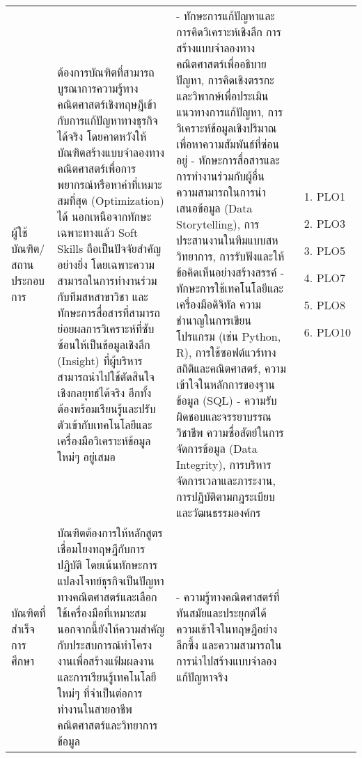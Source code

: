 \begin{longtable}{| >{\raggedright}p{} | >{\raggedright}p{} | >{\raggedright}p{} | >{\centering\arraybackslash}p{} |}
    
    \multicolumn{4}{|l|}{\textbf{ผู้มีส่วนได้ส่วนเสียภายนอก (External Stakeholders)}} \\
    \hline
    ผู้ใช้บัณฑิต/สถานประกอบการ & 
ต้องการบัณฑิตที่สามารถ\newline บูรณาการความรู้ทางคณิตศาสตร์เชิงทฤษฎีเข้ากับการแก้ปัญหาทางธุรกิจได้จริง โดยคาดหวังให้บัณฑิตสร้างแบบจำลองทางคณิตศาสตร์เพื่อการพยากรณ์หรือหาค่าที่เหมาะสมที่สุด (Optimization) ได้ นอกเหนือจากทักษะเฉพาะทางแล้ว Soft Skills ถือเป็นปัจจัยสำคัญอย่างยิ่ง โดยเฉพาะความสามารถในการทำงานร่วมกับทีมสหสาขาวิชา และทักษะการสื่อสารที่สามารถย่อยผลการวิเคราะห์ที่ซับซ้อนให้เป็นข้อมูลเชิงลึก (Insight) ที่ผู้บริหารสามารถนำไปใช้ตัดสินใจเชิงกลยุทธ์ได้จริง อีกทั้งต้องพร้อมเรียนรู้และปรับตัวเข้ากับเทคโนโลยีและเครื่องมือวิเคราะห์ข้อมูลใหม่ๆ อยู่เสมอ &
- ทักษะการแก้ปัญหาและการคิดวิเคราะห์เชิงลึก การสร้างแบบจำลองทางคณิตศาสตร์เพื่ออธิบายปัญหา, การคิดเชิงตรรกะและวิพากษ์เพื่อประเมินแนวทางการแก้ปัญหา, การวิเคราะห์ข้อมูลเชิงปริมาณเพื่อหาความสัมพันธ์ที่ซ่อนอยู่ \newline
- ทักษะการสื่อสารและการทำงานร่วมกับผู้อื่น ความสามารถในการนำเสนอข้อมูล (Data Storytelling), การประสานงานในทีมแบบสหวิทยาการ, การรับฟังและให้ข้อคิดเห็นอย่างสร้างสรรค์ \newline
- ทักษะการใช้เทคโนโลยีและเครื่องมือดิจิทัล ความชำนาญในการเขียนโปรแกรม (เช่น Python, R), การใช้ซอฟต์แวร์ทางสถิติและคณิตศาสตร์, ความเข้าใจในหลักการของฐานข้อมูล (SQL) \newline
- ความรับผิดชอบและจรรยาบรรณวิชาชีพ ความซื่อสัตย์ในการจัดการข้อมูล (Data Integrity), การบริหารจัดการเวลาและภาระงาน, การปฏิบัติตามกฎระเบียบและวัฒนธรรมองค์กร &
\vspace{-0.3cm}
\begin{enumerate}[label={}]
	\item PLO1
	\item PLO3
	\item PLO5
	\item PLO7
	\item PLO8
	\item PLO10
\end{enumerate}
 \\    
\hline
บัณฑิตที่สำเร็จการศึกษา & 
บัณฑิตต้องการให้หลักสูตรเชื่อมโยงทฤษฎีกับการปฏิบัติ โดยเน้นทักษะการแปลงโจทย์ธุรกิจเป็นปัญหาทางคณิตศาสตร์และเลือกใช้เครื่องมือที่เหมาะสม นอกจากนี้ยังให้ความสำคัญกับประสบการณ์ทำโครงงานเพื่อสร้างแฟ้มผลงาน และการเรียนรู้เทคโนโลยีใหม่ๆ ที่จำเป็นต่อการทำงานในสายอาชีพคณิตศาสตร์และวิทยาการข้อมูล 
&
- ความรู้ทางคณิตศาสตร์ที่ทันสมัยและประยุกต์ได้ ความเข้าใจในทฤษฎีอย่างลึกซึ้ง และความสามารถในการนำไปสร้างแบบจำลองแก้ปัญหาจริง \newline

\end{longtable}
